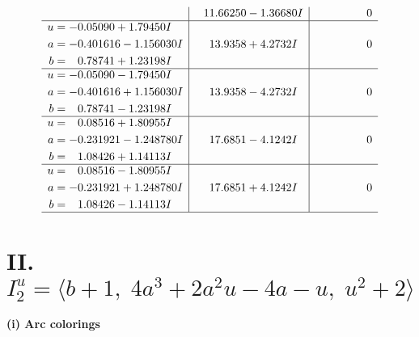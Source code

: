 \documentclass[1p]{elsarticle_modified}
\theoremstyle{definition}
\begin{document}
$$\begin{array}{c|c|c}
 & \phantom{-}11.66250 - 1.36680 I & \phantom{-0.000000 } 0 \\ \hline\begin{aligned}
u &= -0.05090 + 1.79450 I \\
a &= -0.401616 - 1.156030 I \\
b &= \phantom{-}0.78741 + 1.23198 I\end{aligned}
 & \phantom{-}13.9358 + 4.2732 I & \phantom{-0.000000 } 0 \\ \hline\begin{aligned}
u &= -0.05090 - 1.79450 I \\
a &= -0.401616 + 1.156030 I \\
b &= \phantom{-}0.78741 - 1.23198 I\end{aligned}
 & \phantom{-}13.9358 - 4.2732 I & \phantom{-0.000000 } 0 \\ \hline\begin{aligned}
u &= \phantom{-}0.08516 + 1.80955 I \\
a &= -0.231921 - 1.248780 I \\
b &= \phantom{-}1.08426 + 1.14113 I\end{aligned}
 & \phantom{-}17.6851 - 4.1242 I & \phantom{-0.000000 } 0 \\ \hline\begin{aligned}
u &= \phantom{-}0.08516 - 1.80955 I \\
a &= -0.231921 + 1.248780 I \\
b &= \phantom{-}1.08426 - 1.14113 I\end{aligned}
 & \phantom{-}17.6851 + 4.1242 I & \phantom{-0.000000 } 0\\
 \hline 
 \end{array}$$\newpage\newpage\renewcommand{\arraystretch}{1}
\centering \section*{II. $I^u_{2}= \langle b+1,\;4 a^3+2 a^2 u-4 a- u,\;u^2+2 \rangle$}
\flushleft \textbf{(i) Arc colorings}\\
\end{document}
